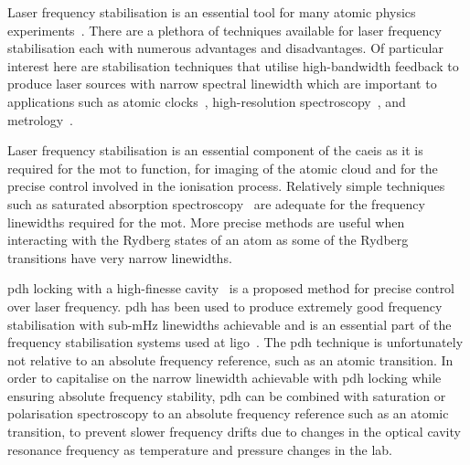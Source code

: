 
Laser frequency stabilisation is an essential tool for many atomic physics experiments~\cite{fox_1._2003,anderson_observation_1995,demarco_onset_1999,uetake_high_2008,ye_stable_2010,akamatsu_narrow_2012}.
There are a plethora of techniques available for laser frequency stabilisation each with numerous advantages and disadvantages.
Of particular interest here are stabilisation techniques that utilise high-bandwidth feedback to produce laser sources with narrow spectral linewidth which are important to applications such as atomic clocks~\cite{ludlow_sr_2008}, high-resolution spectroscopy~\cite{rafac_sub-dekahertz_2000}, and metrology~\cite{metcalf_laser_1999,ye_quantum_2008}.

Laser frequency stabilisation is an essential component of the \gls{caeis} as it is required for the \gls{mot} to function, for imaging of the atomic cloud and for the precise control involved in the ionisation process.
Relatively simple techniques such as saturated absorption spectroscopy~\cite{haroche_theory_1972,preston_doppler-free_1996,maguire_theoretical_2006} are adequate for the frequency linewidths required for the \gls{mot}.
More precise methods are useful when interacting with the Rydberg states of an atom as some of the Rydberg transitions have very narrow linewidths.

\Gls{pdh} locking with a high-finesse cavity~\cite{drever_laser_1983} is a proposed method for precise control over laser frequency.
\Gls{pdh} has been used to produce extremely good frequency stabilisation with sub-\unit[40]{mHz} linewidths achievable and is an essential part of the frequency stabilisation systems used at \gls{ligo}~\cite{ludlow_compact_2007,kessler_sub-40-mhz-linewidth_2012,abramovici_ligo:_1992,black_introduction_2001}.
The \gls{pdh} technique is unfortunately not relative to an absolute frequency reference, such as an atomic transition.
In order to capitalise on the narrow linewidth achievable with \gls{pdh} locking while ensuring absolute frequency stability, \gls{pdh} can be combined with saturation or polarisation spectroscopy to an absolute frequency reference such as an atomic transition, to prevent slower frequency drifts due to changes in the optical cavity resonance frequency as temperature and pressure changes in the lab.

